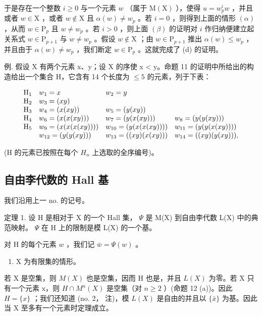 于是存在一个整数 \(i \geqslant 0\) 与一个元素 \(w\) （属于 \(\mathrm{M}(\mathrm{X})\) ），使得 \(u = w_p^i w\) ，并且或者 \(w \in \mathrm{X}\) ，或者 \(w \notin \mathrm{X}\) 且 \(\alpha(w) \neq w_p\) 。若 \(i = 0\) ，则得到上面的情形 \((\alpha)\) ，从而 \(w \in \mathrm{P}_p\) 且 \(w \neq w_p\) 。若 \(i > 0\) ，则上面 \((\beta)\) 的证明对 \(i\) 作归纳便建立起关系式 \(w \in \mathrm{P}_{p+1}\) 与 \(w \neq w_p\) 。假设 \(w \notin \mathrm{X}\) ；由 \(w \in \mathrm{P}_{p+1}\) 推出 \(\alpha(w) \leqslant w_p\) ，并且由于 \(\alpha(w) \neq w_p\) ，我们断定 \(w \in \mathrm{P}_p\) 。这就完成了 (d) 的证明。

例. 假设 X 有两个元素 x、y；设 X 的序使 x < y。命题 11 的证明中所给出的构造给出一个集合 H，它含有 14 个长度为 \(\leqslant 5\) 的元素，列于下表：

\[
\begin{array}{l l l l} \mathrm{H} _ {1} & w _ {1} = x & w _ {2} = y \\ \mathrm{H} _ {2} & w _ {3} = (x y) \\ \mathrm{H} _ {3} & w _ {4} = (x (x y)) & w _ {5} = (y (x y)) \\ \mathrm{H} _ {4} & w _ {6} = (x (x (x y))) & w _ {7} = (y (x (x y))) & w _ {8} = (y (y (x y))) \\ \mathrm{H} _ {5} & w _ {9} = (x (x (x (x y)))) & w _ {10} = (y (x (x (x y)))) & w _ {11} = (y (y (x (x y)))) \\ & w _ {12} = (y (y (x y))) & w _ {13} = ((x y) (x (x y))) & w _ {14} = ((x y) (y (x y))), \end{array}
\]

(H 的元素已按照在每个 \(H_{n}\) 上选取的全序编号)。

\subsection{自由李代数的 Hall 基}

我们沿用上一 no. 的记号。

定理 1. 设 H 是相对于 X 的一个 Hall 集， \(\Psi\) 是 M(X) 到自由李代数 L(X) 中的典范映射。 \(\Psi\) 在 H 上的限制是模 L(X) 的一个基。

对 H 的每个元素 \(w\) ，我们记 \(\bar{w} = \Psi(w)\) 。

\begin{enumerate}
\def\labelenumi{(\Alph{enumi})}
\tightlist
\item
  X 为有限集的情形。
\end{enumerate}

若 X 是空集，则 \(M(X)\) 也是空集，因而 H 也是，并且 \(L(X)\) 为零。若 X 只有一个元素 x，则 \(H \cap M^{n}(X)\) 是空集（对 \(n \geqslant 2\) ）(命题 12 (a))。因此 \(H = \{x\}\) ；我们还知道 (no. 2， 注)，模 \(L(X)\) 是自由的并且以 \(\{\bar{x}\}\) 为基。因此当 X 至多有一个元素时定理成立。

